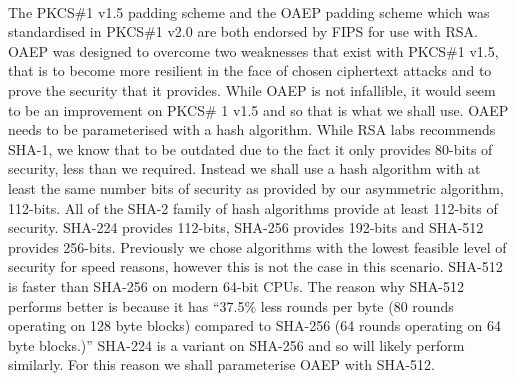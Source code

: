 \documentclass[12pt, titlepage]{article}
\begin{document}
\\
The PKCS\#1 v1.5 padding scheme and the OAEP padding scheme which was standardised in PKCS\#1 v2.0 are both endorsed by FIPS for use with RSA. OAEP was designed to overcome two weaknesses that exist with PKCS\#1 v1.5, that is to become more resilient in the face of chosen ciphertext attacks and to prove the security that it provides. While OAEP is not infallible\cite{oaepAttack}, it would seem to be an improvement on PKCS\# 1 v1.5 and so that is what we shall use.
\newline \indent OAEP needs to be parameterised with a hash algorithm. While RSA labs recommends SHA-1, we know that to be outdated due to the fact it only provides 80-bits of security, less than we required. Instead we shall use a hash algorithm with at least the same number bits of security as provided by our asymmetric algorithm, 112-bits. All of the SHA-2 family of hash algorithms provide at least 112-bits of security. SHA-224 provides 112-bits, SHA-256 provides 192-bits and SHA-512 provides 256-bits. Previously we chose algorithms with the lowest feasible level of security for speed reasons, however this is not the case in this scenario. SHA-512 is faster than SHA-256 on modern 64-bit CPUs. The reason why SHA-512 performs better is because it has ``37.5\% less rounds per byte (80 rounds operating on 128 byte blocks) compared to SHA-256 (64 rounds operating on 64 byte blocks.)''\cite{sha512Faster} SHA-224 is a variant on SHA-256 and so will likely perform similarly. For this reason we shall parameterise OAEP with SHA-512.
\end{document}
